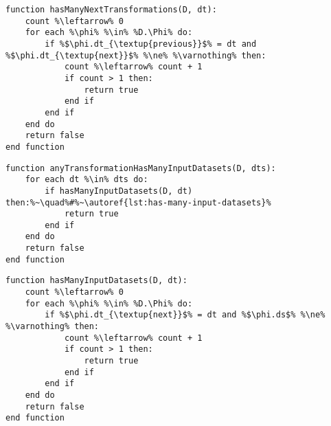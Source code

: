 \begin{minipage}[c]{0.95\textwidth} \begin{lstlisting}[language=pseudocode,label={lst:has-many-next-transformations},caption={[Contagem das próximas transformações de dados de uma transformação]Contagem das próximas transformações de dados de uma transformação de dados. Retorna verdadeiro caso essa quantidade seja maior do que 1, e falso caso contrário.}]
function hasManyNextTransformations(D, dt):
    count %\leftarrow% 0
    for each %\phi% %\in% %D.\Phi% do:
        if %$\phi.dt_{\textup{previous}}$% = dt and %$\phi.dt_{\textup{next}}$% %\ne% %\varnothing% then:
            count %\leftarrow% count + 1
            if count > 1 then:
                return true
            end if
        end if
    end do
    return false
end function
\end{lstlisting}
\end{minipage}

\vfill{}

\begin{minipage}[c]{0.95\textwidth} \begin{lstlisting}[language=pseudocode,label={lst:any-transformation-has-many-input-datasets},caption={[Determinação de se pelo menos uma transformação possui mais de 1 conjunto de dados de entrada.]Determinação de se pelo menos uma transformação de dados possui mais de 1 conjunto de dados de entrada. Retorna verdadeiro caso positivo, e falso caso contrário.}]
function anyTransformationHasManyInputDatasets(D, dts):
    for each dt %\in% dts do:
        if hasManyInputDatasets(D, dt) then:%~\quad%#%~\autoref{lst:has-many-input-datasets}%
            return true
        end if
    end do
    return false
end function
\end{lstlisting}
\end{minipage}

\vfill{}

\begin{minipage}[c]{0.95\textwidth} \begin{lstlisting}[language=pseudocode,label={lst:has-many-input-datasets},caption={[Contagem dos conjuntos de dados anteriores a uma transformação]Contagem dos conjuntos de dados anteriores a uma transformação de dados. Retorna verdadeiro caso essa quantidade seja maior do que 1, e falso caso contrário.}]
function hasManyInputDatasets(D, dt):
    count %\leftarrow% 0
    for each %\phi% %\in% %D.\Phi% do:
        if %$\phi.dt_{\textup{next}}$% = dt and %$\phi.ds$% %\ne% %\varnothing% then:
            count %\leftarrow% count + 1
            if count > 1 then:
                return true
            end if
        end if
    end do
    return false
end function
\end{lstlisting}
\end{minipage}

